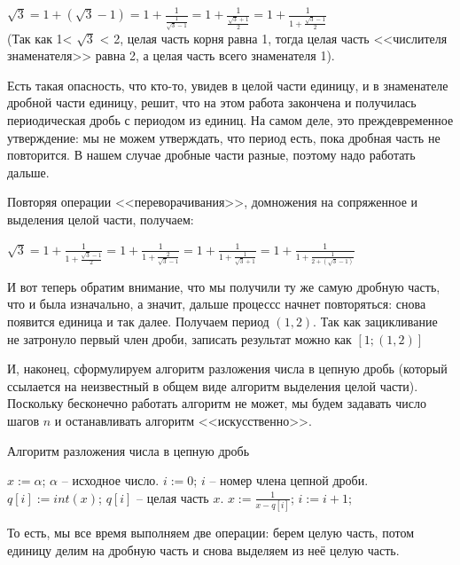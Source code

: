 \documentclass[russian]{lecture-notes}
\begin{document}
\begin{example*}
		$\sqrt{3} = 1 + (\sqrt{3} - 1) = 1 + \frac{1}{\frac{1}{\sqrt{3}-1}} = 1 + \frac{1}{\frac{\sqrt{3}+1}{2}} = 1 + \frac{1}{1+\frac{\sqrt{3}-1}{2}}$\\ (Так как 1< $\sqrt{3}$ < 2, целая часть корня равна 1, тогда целая часть <<числителя знаменателя>> равна 2, а целая часть всего знаменателя 1).
		
		Есть такая опасность, что кто-то, увидев в целой части единицу, и в знаменателе дробной части единицу, решит, что на этом работа закончена и получилась периодическая дробь с периодом из единиц. На самом деле, это преждевременное утверждение: мы не можем утверждать, что период есть, пока дробная часть не повторится. В нашем случае дробные части разные, поэтому надо работать дальше. 
		
		Повторяя операции <<переворачивания>>, домножения на сопряженное и выделения целой части, получаем:
		
		$\sqrt{3} = 1 + \frac{1}{1+\frac{\sqrt{3}-1}{2}} = 1 + \frac{1}{1+\frac{2}{\sqrt{3}-1}} = 1 + \frac{1}{1+\frac{1}{\sqrt{3}+1}} = 1 + \frac{1}{1+\frac{1}{2 + (\sqrt{3}-1)}}$ 
		
		И вот теперь обратим внимание, что мы получили ту же самую дробную часть, что и была изначально, а значит, дальше процессс начнет повторяться: снова появится единица и так далее. Получаем период $(1,2)$. Так как зацикливание не затронуло первый член дроби, записать результат можно как $[1; (1,2)]$
	\end{example*}

	И, наконец, сформулируем алгоритм разложения числа в цепную дробь (который ссылается на неизвестный в общем виде алгоритм выделения целой части).
	Поскольку бесконечно  работать алгоритм не может,   мы будем задавать число шагов $n$ и останавливать алгоритм <<искусственно>>.
	
	\begin{algorithm}[H]
		\caption{Алгоритм разложения числа в цепную дробь}
		\label{alg:klass}
		\begin{algorithmic}[1]
			\State $x := \alpha$;
			\Comment $\alpha$ -- исходное число.
			\State $i := 0$;
			\Comment $i$ -- номер члена цепной дроби.
			\State $q[i] := int(x)$;
			\Comment $q[i]$ -- целая часть $x$.
			\State $x := \frac{1}{x-q[i]}$;
			\State $i := i + 1$;
			\EndWhile
		\end{algorithmic}
	\end{algorithm}
			
	То есть, мы все время выполняем две операции: берем целую часть, потом единицу делим на дробную часть и снова выделяем из неё целую часть.
	
\end{document}
